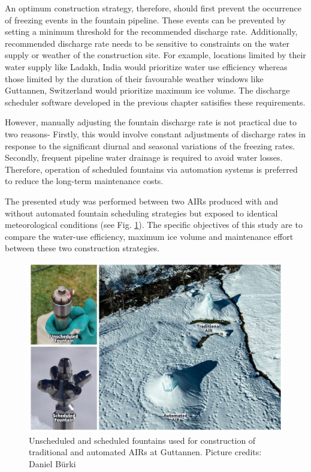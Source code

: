 An optimum construction strategy, therefore, should first prevent the occurrence of freezing events in the
fountain pipeline. These events can be prevented by setting a minimum threshold for the recommended discharge
rate. Additionally, recommended discharge rate needs to be sensitive to constraints on the water supply or
weather of the construction site. For example, locations limited by their water supply like Ladakh, India
would prioritize water use efficiency whereas those limited by the duration of their favourable weather windows
like Guttannen, Switzerland would prioritize maximum ice volume. The discharge scheduler software developed in
the previous chapter satisifies these requirements.

However, manually adjusting the fountain discharge rate is not practical due to two reasons- Firstly, this would
involve constant adjustments of discharge rates in response to the significant diurnal and seasonal variations
of the freezing rates. Secondly, frequent pipeline water drainage is required to avoid water losses. Therefore,
operation of scheduled fountains via automation systems is preferred to reduce the long-term maintenance costs.

The presented study was performed between two AIRs produced with and without automated fountain scheduling
strategies but exposed to identical meteorological conditions (see Fig. \ref{fig:2AIR}). The specific objectives
of this study are to compare the water-use efficiency, maximum ice volume and maintenance effort between these
two construction strategies.

\begin{figure}[htb]
\includegraphics[width=12cm]{figs/AIR_fountains.jpg}
\caption{Unscheduled and scheduled fountains used for construction of traditional and automated AIRs at Guttannen. Picture credits: Daniel Bürki}
\label{fig:2AIR}
\end{figure}

